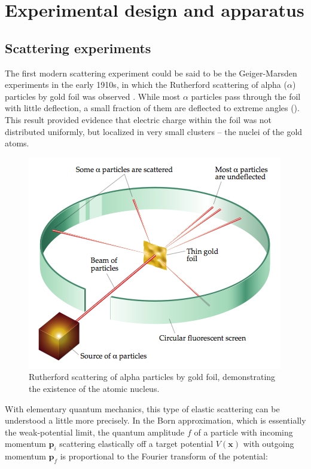 \graphicspath{{Chapter-Experiment/figures/}}
\chapter{Experimental design and apparatus}

\section{Scattering experiments}
The first modern scattering experiment could be said to be the Geiger-Marsden experiments in the early 1910s, in which the Rutherford scattering of alpha ($\alpha$) particles by gold foil was observed \cite{Rutherford:1911zz}.
While most $\alpha$ particles pass through the foil with little deflection, a small fraction of them are deflected to extreme angles (\Fig{\ref{fig:rutherford}}).
This result provided evidence that electric charge within the foil was not distributed uniformly, but localized in very small clusters -- the nuclei of the gold atoms.
\begin{figure}[t]
  \includegraphics[width=0.8\linewidth]{BLB-1070873-Rutherford_v2.jpg}
  \caption{Rutherford scattering of alpha particles by gold foil, demonstrating the existence of the atomic nucleus.}
  \label{fig:rutherford}
\end{figure}

With elementary quantum mechanics, this type of elastic scattering can be understood a little more precisely.
In the Born approximation, which is essentially the weak-potential limit, the quantum amplitude $f$ of a particle with incoming momentum $\mathbf{p}_{i}$ scattering elastically off a target potential $V(\mathbf{x})$ with outgoing momentum $\mathbf{p}_{f}$ is proportional to the Fourier transform of the potential:


